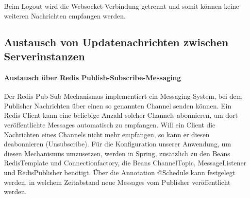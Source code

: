 Beim Logout wird die Websocket-Verbindung getrennt und somit können keine weiteren Nachrichten empfangen werden.

\subsection{Austausch von Updatenachrichten zwischen
Serverinstanzen}
\paragraph{Austausch über Redis Publish-Subscribe-Messaging}
Der Redis Pub-Sub Mechanismus implementiert ein Messaging-System, bei dem Publisher Nachrichten
über einen so genannten Channel senden können. Ein Redis Client kann eine beliebige Anzahl solcher Channels
abonnieren, um dort veröffentlichte Messages automatisch zu empfangen. Will ein Client die Nachrichten eines Channels
nicht mehr empfangen, so kann er diesen deabonnieren (Unsubscribe).
Für die Konfiguration unserer Anwendung, um diesen Mechanismus umzusetzen, werden in Spring, zusätzlich zu den Beans RedisTemplate und Connectionfactory,
die Beans ChannelTopic, MessageListener und RedisPublisher benötigt. Über die Annotation @Schedule kann festgelegt werden, in welchem
Zeitabstand neue Messages vom Publisher veröffentlicht werden.
